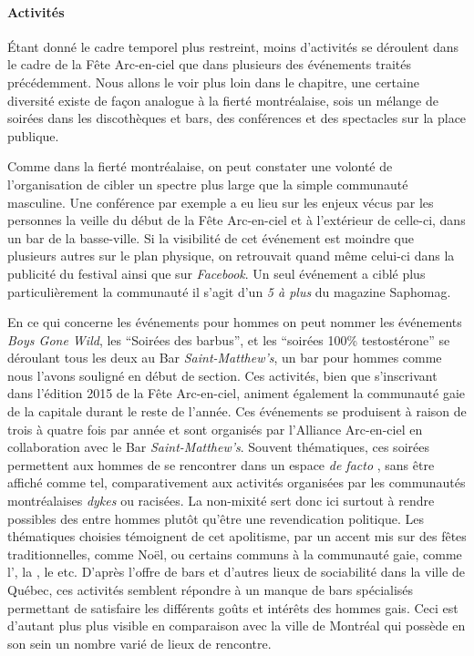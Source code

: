 \paragraph{Activités}
\label{subsec:activitesfetearcenciel}
Étant donné le cadre temporel plus restreint, moins d'activités se déroulent dans le cadre de la Fête Arc-en-ciel que dans plusieurs des événements traités précédemment.
Nous allons le voir plus loin dans le chapitre, une certaine diversité existe de façon analogue à la fierté montréalaise, sois un mélange de soirées dans les discothèques et bars, des conférences et des spectacles sur la place publique.

Comme dans la fierté montréalaise, on peut constater une volonté de l'organisation de cibler un spectre plus large que la simple communauté  masculine.
Une conférence par exemple a eu lieu sur les enjeux vécus par les personnes  la veille du début de la Fête Arc-en-ciel et à l'extérieur de celle-ci, dans un bar de la basse-ville.
Si la visibilité de cet événement est moindre que plusieurs autres sur le plan physique, on retrouvait quand même celui-ci dans la publicité du festival ainsi que sur \emph{Facebook}.
Un seul événement a ciblé plus particulièrement la communauté  il s'agit d'un \emph{5 à plus} du magazine Saphomag.

En ce qui concerne les événements pour hommes  on peut nommer les événements \emph{Boys Gone Wild}, les \enquote{Soirées des barbus}, et les \enquote{soirées 100\% testostérone} se déroulant tous les deux au Bar \emph{Saint-Matthew's}, un bar pour hommes comme nous l'avons souligné en début de section.
Ces activités, bien que s'inscrivant dans l'édition 2015 de la Fête Arc-en-ciel, animent également la communauté gaie de la capitale durant le reste de l'année.
Ces événements se produisent à raison de trois à quatre fois par année et sont organisés par l'Alliance Arc-en-ciel en collaboration avec le Bar \emph{Saint-Matthew's}.
Souvent thématiques, ces soirées permettent aux hommes de se rencontrer dans un espace \emph{de facto} , sans être affiché comme tel, comparativement aux activités organisées par les communautés montréalaises \emph{dykes} ou racisées.
La non-mixité sert donc ici surtout à rendre possibles des  entre hommes plutôt qu'être une revendication politique.
Les thématiques choisies témoignent de cet apolitisme, par un accent mis sur des fêtes traditionnelles, comme Noël, ou certains  communs à la communauté gaie, comme l', la , le  etc.
D'après l'offre de bars et d'autres lieux de sociabilité dans la ville de Québec, ces activités semblent répondre à un manque de bars spécialisés permettant de satisfaire les différents goûts et intérêts des hommes gais.
Ceci est d'autant plus plus visible en comparaison avec la ville de Montréal qui possède en son sein un nombre varié de lieux de rencontre.

